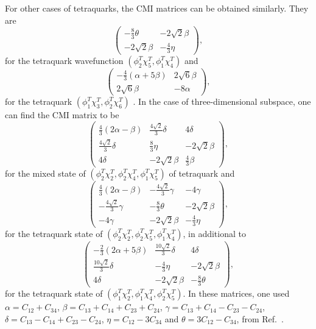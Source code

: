 \documentclass[12pt,prd,onecolumn,floatfix,nofootinbib]{revtex4}
\begin{document}
For other cases of tetraquarks, the CMI matrices can be obtained similarly.
They are
\begin{equation}
\begin{pmatrix}
-\frac{8}{3}\theta & -2\sqrt{2}\beta \\
-2\sqrt{2}\beta & -\frac{4}{3}\eta%
\end{pmatrix}%
,  \label{21mixing54}
\end{equation}%
for the tetraquark wavefunction $(\phi _{2}^{T}\chi _{5}^{T},\phi
_{1}^{T}\chi _{4}^{T})$ and
\begin{equation}
\begin{pmatrix}
-\frac{4}{3}(\alpha +5\beta ) & 2\sqrt{6}\beta \\
2\sqrt{6}\beta & -8\alpha%
\end{pmatrix}%
,  \label{12mixing36}
\end{equation}%
for the tetraquark $(\phi _{1}^{T}\chi _{3}^{T},\phi _{2}^{T}\chi _{6}^{T})$%
. In the case of three-dimensional subspace, one can find the CMI matrix to
be
\begin{equation}
\begin{pmatrix}
\frac{4}{3}(2\alpha -\beta ) & \frac{4\sqrt{2}}{3}\delta & 4\delta \\
\frac{4\sqrt{2}}{3}\delta & \frac{8}{3}\eta & -2\sqrt{2}\beta \\
4\delta & -2\sqrt{2}\beta & \frac{4}{3}\beta%
\end{pmatrix}%
,  \label{221mixing245}
\end{equation}%
for the mixed state of $(\phi _{2}^{T}\chi _{2}^{T},\phi _{2}^{T}\chi
_{4}^{T},\phi _{1}^{T}\chi _{5}^{T})$ of tetraquark and
\begin{equation}
\begin{pmatrix}
\frac{4}{3}(2\alpha -\beta ) & -\frac{4\sqrt{2}}{3}\gamma & -4\gamma \\
-\frac{4\sqrt{2}}{3}\gamma & -\frac{8}{3}\theta & -2\sqrt{2}\beta \\
-4\gamma & -2\sqrt{2}\beta & -\frac{4}{3}\eta%
\end{pmatrix}%
,  \label{221mixing254}
\end{equation}%
for the tetraquark state of $(\phi _{2}^{T}\chi _{2}^{T},\phi _{2}^{T}\chi
_{5}^{T},\phi _{1}^{T}\chi _{4}^{T})$, in additional to
\begin{equation}
\begin{pmatrix}
-\frac{2}{3}(2\alpha +5\beta ) & \frac{10\sqrt{2}}{3}\delta & 4\delta \\
\frac{10\sqrt{2}}{3}\delta & -\frac{4}{3}\eta & -2\sqrt{2}\beta \\
4\delta & -2\sqrt{2}\beta & -\frac{8}{3}\theta%
\end{pmatrix}%
,  \label{112mixing245}
\end{equation}%
for the tetraquark state of $(\phi _{1}^{T}\chi _{2}^{T},\phi _{1}^{T}\chi
_{4}^{T},\phi _{2}^{T}\chi _{5}^{T})$. In these matrices, one used $\alpha
=C_{12}+C_{34}$, $\beta =C_{13}+C_{14}+C_{23}+C_{24}$, $\gamma
=C_{13}+C_{14}-C_{23}-C_{24}$, $\delta =C_{13}-C_{14}+C_{23}-C_{24}$, $\eta
=C_{12}-3C_{34}$ and $\theta =3C_{12}-C_{34}$, from Ref.~\cite{Luo:2017eub}.
\end{document}
